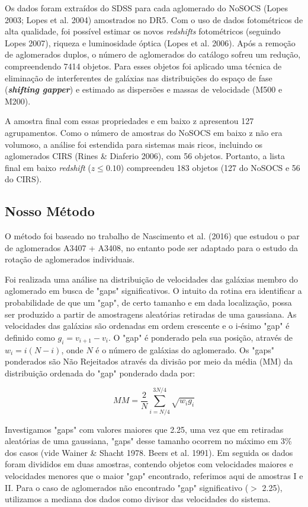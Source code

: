 Os dados foram extraídos do SDSS para cada aglomerado do NoSOCS (Lopes 2003; Lopes et al. 2004) amostrados no DR5. Com o uso de dados fotométricos de alta qualidade, foi possível estimar os novos \textit{redshifts} fotométricos (seguindo Lopes 2007), riqueza e luminosidade óptica (Lopes et al. 2006). Após a remoção de aglomerados duplos, o número de aglomerados do catálogo sofreu um redução, compreendendo 7414 objetos. Para esses objetos foi aplicado uma técnica de eliminação de interferentes de galáxias nas distribuições do espaço de fase (\textit{\textbf{shifting gapper}}) e estimado as dispersões e massas de velocidade (M500 e M200). 

A amostra final com essas propriedades e em baixo z apresentou 127 agrupamentos. Como o número de amostras do NoSOCS em baixo z não era volumoso, a análise foi estendida para sistemas mais ricos, incluindo os aglomerados CIRS (Rines \& Diaferio 2006), com 56 objetos. Portanto, a lista final em baixo \textit{redshift} ($z \leq 0.10$) compreendeu 183 objetos (127 do NoSOCS e 56 do CIRS). 
 
\subsection{Nosso Método}
O método foi baseado no trabalho de Nascimento et al. (2016) que estudou o par de aglomerados A3407 + A3408, no entanto pode ser adaptado para o estudo da rotação de aglomerados individuais. 

Foi realizada uma análise na distribuição de velocidades das galáxias membro do aglomerado em busca de "gaps" significativos. O intuito da rotina era identificar a probabilidade de que um "gap",  de certo tamanho e em dada localização, possa ser produzido a partir de amostragens aleatórias retiradas de uma gaussiana. As velocidades das galáxias são ordenadas em ordem crescente e o i-ésimo "gap" é definido como $g_i = v_{i+1} - v_i$. O "gap" é ponderado pela sua posição, através de $w_i=i(N-i)$, onde $N$ é o número de galáxias do aglomerado. Os "gaps" ponderados são Não Rejeitados através da divisão por meio da média (MM) da distribuição ordenada do "gap" ponderado dada por: 

\begin{equation}
MM = \frac{2}{N} \sum_{i=N/4}^{3N/4} \sqrt{w_i g_i}
\label{eq:gappomderado}
\end{equation}

Investigamos "gaps" com valores maiores que 2.25, uma vez que em retiradas aleatórias de uma gaussiana, "gaps" desse tamanho ocorrem no máximo em 3\% dos casos (vide Wainer \& Shacht 1978. Beers et al. 1991). Em seguida os dados foram divididos em duas amostras, contendo objetos com velocidades maiores e velocidades menores que o maior "gap" encontrado, referimos aqui de amostras I e II. Para o caso de aglomerados não encontrado "gap" significativo ($>$ 2.25), utilizamos a mediana dos dados como divisor das velocidades do sistema.


